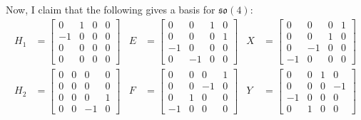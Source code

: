 \begin{example}
	Now, I claim that the following gives a basis for $\mathfrak{so}(4)$:
	\begin{align*}
		H_1 & = \begin{bmatrix} 
			0 & 1 & 0 & 0 \\
			-1 & 0 & 0 & 0 \\
			0 & 0 & 0 & 0 \\
			0 & 0 & 0 & 0 \end{bmatrix} & 
		E & = \begin{bmatrix}
			0 & 0 & 1 & 0 \\
			0 & 0 & 0 & 1 \\
			-1 & 0 & 0 & 0 \\
			0 & -1 & 0 & 0
 		\end{bmatrix} & 
		X & = \begin{bmatrix}
			0 & 0 & 0 & 1 \\
			0 & 0 & 1 & 0 \\
			0 & -1 & 0 & 0 \\
			-1 & 0 & 0 & 0
		\end{bmatrix} \\
		H_2 & = \begin{bmatrix} 
		   	0 & 0 & 0 & 0 \\
		   	0 & 0 & 0 & 0 \\
		   	0 & 0 & 0 & 1 \\
		   	0 & 0 & -1 & 0 \end{bmatrix} & 
		F & = \begin{bmatrix}
			0 & 0 & 0 & 1 \\
			0 & 0 & -1 & 0 \\
			0 & 1 & 0 & 0 \\
			-1 & 0 & 0 & 0
 		\end{bmatrix} & 
		Y & = \begin{bmatrix}
		    0 & 0 & 1 & 0 \\
		    0 & 0 & 0 & -1 \\
		    -1 & 0 & 0 & 0 \\
		    0 & 1 & 0 & 0
		\end{bmatrix}
	\end{align*}
	

\end{example}
